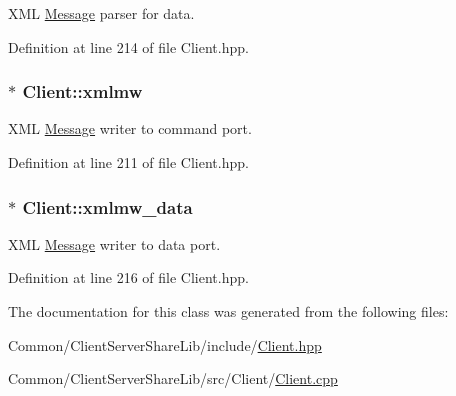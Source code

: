 X\+M\+L \hyperlink{class_message}{Message} parser for data. 



Definition at line 214 of file Client.\+hpp.

\hypertarget{class_client_a4b344048fac2605fed5405cfa3425d4d}{}
\subsubsection[{xmlmw}]{$\ast$ Client\+::xmlmw\hspace{0.3cm}{\ttfamily [protected]}}\label{class_client_a4b344048fac2605fed5405cfa3425d4d}


X\+M\+L \hyperlink{class_message}{Message} writer to command port. 



Definition at line 211 of file Client.\+hpp.

\hypertarget{class_client_a511d77665d9f4a3094bf6876bc2688b0}{}
\subsubsection[{xmlmw\+\_\+data}]{$\ast$ Client\+::xmlmw\+\_\+data\hspace{0.3cm}{\ttfamily [protected]}}\label{class_client_a511d77665d9f4a3094bf6876bc2688b0}


X\+M\+L \hyperlink{class_message}{Message} writer to data port. 



Definition at line 216 of file Client.\+hpp.



The documentation for this class was generated from the following files\+:\begin{DoxyCompactItemize}
\item 
Common/\+Client\+Server\+Share\+Lib/include/\hyperlink{_client_8hpp}{Client.\+hpp}\item 
Common/\+Client\+Server\+Share\+Lib/src/\+Client/\hyperlink{_client_8cpp}{Client.\+cpp}\end{DoxyCompactItemize}

